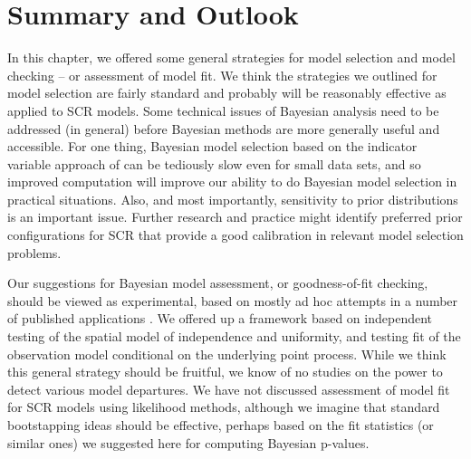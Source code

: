 \section{ Summary and Outlook  }



In this chapter, we offered some general strategies for model
selection and model checking -- or assessment of model fit.  We think
the strategies we outlined for model selection are fairly standard
and probably will be reasonably effective as applied to SCR models.
Some technical issues of Bayesian analysis need to be addressed (in
general) before Bayesian methods are more generally useful and
accessible.  For one thing, Bayesian model selection based on the
indicator variable approach of \citet{kuo_mallick:1998} can be
tediously slow even for small data sets, and so improved computation
will improve our ability to do Bayesian model selection in practical
situations.  Also, and most importantly, sensitivity to prior
distributions is an important issue. Further research and practice
might identify preferred prior configurations for SCR that provide a
good calibration in relevant model selection problems.

Our suggestions for Bayesian model assessment, or goodness-of-fit
checking, should be viewed as experimental, based on mostly ad hoc
attempts in a number of published applications
\citep[e.g.,]{royle_etal:2009ecol,
  royle_etal:2011mee,gopalaswamy_etal:2012ecol,russell_etal:2012}.
We offered up
a framework based on independent testing of the spatial model of
independence and uniformity, and testing fit of the observation model
conditional on the underlying point process.  While we think this
general strategy should be fruitful, we know of no studies on the
 power to detect various model departures.
We have not discussed assessment of model fit for SCR models using
likelihood methods, although we
imagine that standard bootstapping ideas should be effective, perhaps
based on the fit statistics (or similar ones) we suggested here for
computing Bayesian p-values.

